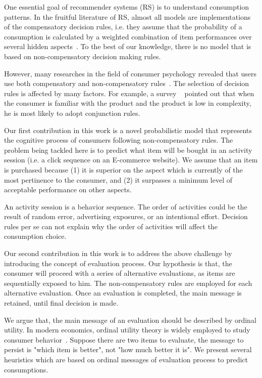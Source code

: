 \documentclass[sigconf]{acmart}
\begin{document}
One essential goal of recommender systems (RS) is to understand consumption patterns. In the fruitful literature of RS, almost all models are implementations of the compensatory decision rules, i.e. they assume that the probability of a consumption is calculated by a weighted combination of item performances over several hidden aspects~\cite{Gopalan2015Scalable,Hu2008Collaborative}. To the best of our knowledge, there is no model that is based on non-compensatory decision making rules.


However, many researches in the field of consumer psychology revealed that users use both compensatory and non-compensatory rules~\cite{Engel1986Consumer}. The selection of decision rules is affected by many factors. For example, a survey ~\cite{Park1976Effect} pointed out that when the consumer is familiar with the product and the product is low in complexity, he is most likely to adopt conjunction rules.




Our first contribution in this work is a novel probabilistic model that represents the cognitive process of consumers following non-compensatory rules. The problem being tackled here is to predict what item will be bought  in an activity session (i.e. a click sequence on an E-commerce website). We assume that an item is purchased because (1) it is superior on the aspect which is currently of the most pertinence to the consumer, and (2) it surpasses a minimum level of acceptable performance on other aspects.


An activity session is a behavior sequence. The order of activities could be the result of random error,  advertising exposures, or an intentional effort. Decision rules per se can not explain why the order of activities will affect the consumption choice.


Our second contribution in this work is to address the above challenge by introducing the concept of evaluation  process. Our hypothesis is that, the consumer will proceed with a series of alternative evaluations, as items are sequentially exposed to him. The non-compensatory rules are employed for each alternative evaluation. Once an evaluation is completed, the main message is retained, until final decision is made.

We argue that, the main message of an evaluation should be described by ordinal utility. In modern economics, ordinal utility theory is widely employed to study consumer behavior~\cite{Simon1959Theories}. Suppose there are two items to evaluate, the message to  persist is "which item is better", not "how much better it is". We present several heuristics which are based on ordinal messages of evaluation process to predict consumptions.
\end{document}
